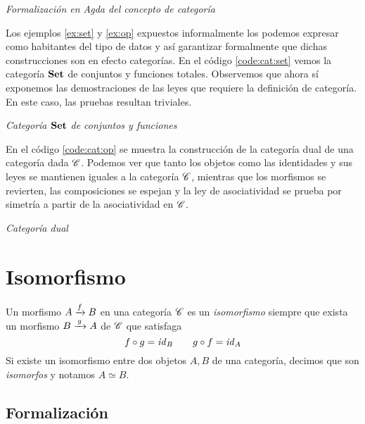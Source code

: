 \begin{agdacode}{\it Formalización en Agda del concepto de categoría}
\label{code:category}

\end{agdacode}

Los ejemplos \ref{ex:set} y \ref{ex:op} expuestos informalmente los podemos expresar como habitantes del tipo de datos  y así garantizar formalmente que dichas construcciones son en efecto categorías.
En el código \ref{code:cat:set} vemos la categoría $\mathbf{Set}$ de conjuntos y funciones totales. Observemos que ahora sí exponemos las demostraciones de las leyes que requiere la definición de categoría. En este caso, las pruebas resultan triviales.

\begin{agdacode}{\it Categoría $\mathbf{Set}$ de conjuntos y funciones}\label{code:cat:set}
  
\end{agdacode}

En el código \ref{code:cat:op} se muestra la construcción de la categoría dual de una categoría dada $\mathscr{C}$. Podemos ver que tanto los objetos como las identidades y sus leyes se mantienen iguales a la categoría $\mathscr{C}$, mientras que los morfismos se revierten, las composiciones se espejan y la ley de asociatividad se prueba por simetría a partir de la asociatividad en $\mathscr{C}$.


\begin{agdacode}{\it Categoría dual}\label{code:cat:op}
  
\end{agdacode}

\section{Isomorfismo}

\begin{definition}
  Un morfismo $ A\xrightarrow{f}B$ en una categoría $\mathscr{C}$ es un {\it isomorfismo} siempre que exista un morfismo $ B\xrightarrow{\,g\,}A$ de $\mathscr{C}$ que satisfaga $$f \circ g = \mathit{id}_{B} \qquad g \circ f = \mathit{id}_{A} $$
  Si existe un isomorfismo entre dos objetos $A, B$ de una categoría, decimos que son {\it isomorfos} y notamos $A \simeq B$.
\end{definition}
\subsection{Formalización}

